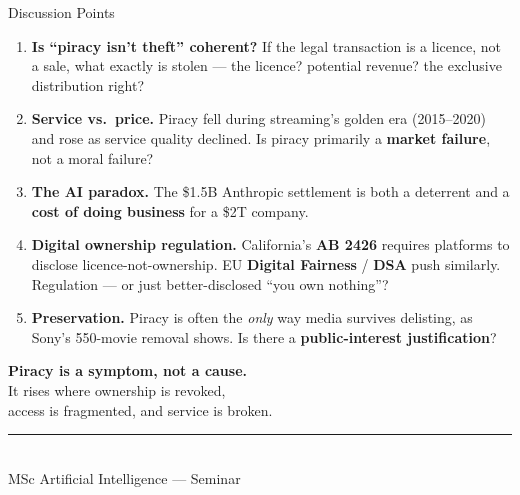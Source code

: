 \documentclass[aspectratio=169,11pt]{beamer}
\begin{document}
	\begin{frame}{Discussion Points}
		\small
		\begin{enumerate}\itemsep0.55em
			\item \textbf{Is ``piracy isn't theft'' coherent?} If the legal transaction is a licence, not a sale, what exactly is stolen --- the licence? potential revenue? the exclusive distribution right?
			\item \textbf{Service vs.\ price.} Piracy fell during streaming's golden era (2015--2020) and rose as service quality declined. Is piracy primarily a \textbf{market failure}, not a moral failure?
			\item \textbf{The AI paradox.} The \$1.5B Anthropic settlement is both a deterrent and a \textbf{cost of doing business} for a \$2T company.
			\item \textbf{Digital ownership regulation.} California's \textbf{AB 2426} requires platforms to disclose licence-not-ownership. EU \textbf{Digital Fairness} / \textbf{DSA} push similarly. Regulation --- or just better-disclosed ``you own nothing''?
			\item \textbf{Preservation.} Piracy is often the \emph{only} way media survives delisting, as Sony's 550-movie removal shows. Is there a \textbf{public-interest justification}?
		\end{enumerate}
	\end{frame}
	
	\begin{frame}{}
		\centering
		\vfill
		{\LARGE\color{ctpMauve}\bfseries Piracy is a symptom, not a cause.}\\[0.8cm]
		{\color{ctpSubtext}\large It rises where ownership is revoked,\\
			access is fragmented, and service is broken.}\\[1.0cm]
		\textcolor{ctpSurface2}{\rule{5cm}{0.6pt}}\\[0.6cm]
		{\color{ctpOverlay0}\small MSc Artificial Intelligence --- Seminar}
		\vfill
	\end{frame}
	
\end{document}
